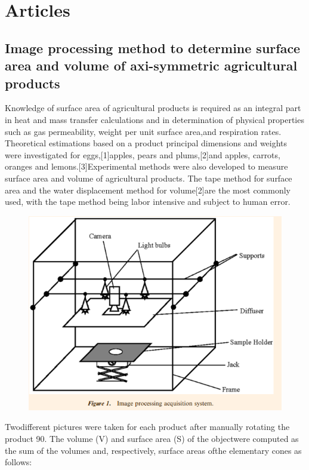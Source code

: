\documentclass[15pt,parskip=full,a4paper]{book}
\begin{document}
	\chapter{Articles}
	\section{ Image processing method to determine surface area and volume of axi-symmetric agricultural products}
Knowledge of surface area of agricultural products is required as an integral part in heat and mass transfer calculations and in determination of physical properties such as gas permeability, weight per unit surface area,and respiration rates. Theoretical estimations based on a product principal dimensions and weights were investigated for eggs,[1]apples, pears and plums,[2]and apples, carrots, oranges and lemons.[3]Experimental methods were also developed to measure surface area and volume of agricultural products. The tape method for surface area and the water displacement method for volume[2]are the most commonly used, with the tape method being labor intensive and subject to human error.

\begin{figure}[h]
	\centering
	\includegraphics[width=0.5\linewidth]{imgs/1}
	\caption{}
	\label{fig:1}
\end{figure}

Twodifferent pictures were taken for each product after manually rotating the product 90. The volume (V) and surface area (S) of the objectwere computed as the sum of the volumes and, respectively, surface areas ofthe elementary cones as follows:
\end{document}
